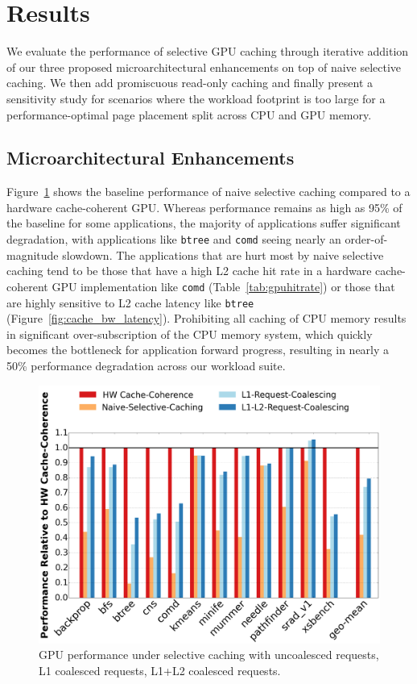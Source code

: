 \section{Results}
\label{results}
We evaluate the performance of selective GPU caching through iterative addition of our three proposed microarchitectural
enhancements on top of naive selective caching. We then add promiscuous read-only caching and 
finally present a sensitivity study for scenarios where the workload footprint is too large for a 
performance-optimal page placement split across CPU and GPU memory.

\subsection{Microarchitectural Enhancements}
Figure~\ref{fig:uncachableperformance} shows the baseline performance of naive selective caching
compared to a hardware cache-coherent GPU.  Whereas performance remains as high as 95\% of the baseline 
for some applications,
the majority of applications suffer significant degradation, with applications like \texttt{btree}
and \texttt{comd} seeing nearly an order-of-magnitude slowdown.  The applications that are hurt most
by naive selective caching tend to be those that have a high L2 cache hit rate
in a hardware cache-coherent GPU
implementation like \texttt{comd} (Table~\ref{tab:gpuhitrate}) or those that are highly sensitive to L2 cache latency
like \texttt{btree} (Figure~\ref{fig:cache_bw_latency}).  Prohibiting all caching of CPU 
memory results in significant over-subscription of the CPU
memory system, which quickly becomes the bottleneck for application forward progress, resulting in
nearly a 50\% performance degradation across our workload suite.

\begin{figure}[t]
\includegraphics[width=1.0\columnwidth]{hpca2016/figures/unconstrainedperformance.png}
\caption{GPU performance under selective caching with uncoalesced requests, L1 coalesced requests,
L1+L2 coalesced requests.}
\label{fig:uncachableperformance}
\end{figure}

